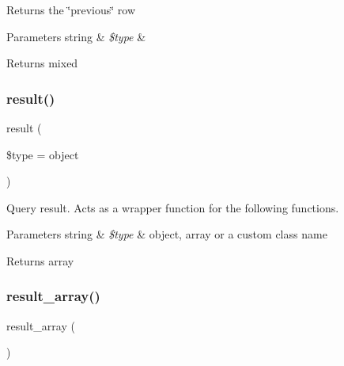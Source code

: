 Returns the \char`\"{}previous\char`\"{} row


\begin{DoxyParams}[1]{Parameters}
string & {\em \$type} & \\
\hline
\end{DoxyParams}
\begin{DoxyReturn}{Returns}
mixed 
\end{DoxyReturn}
\mbox{\label{class_c_i___d_b__result_a86bc3a5f1694241cf86a6fd754553884}} 
\subsubsection{\texorpdfstring{result()}{result()}}
{\footnotesize\ttfamily result (\begin{DoxyParamCaption}\item[{}]{\$type = {\ttfamily \textquotesingle{}object\textquotesingle{}} }\end{DoxyParamCaption})}

Query result. Acts as a wrapper function for the following functions.


\begin{DoxyParams}[1]{Parameters}
string & {\em \$type} & \textquotesingle{}object\textquotesingle{}, \textquotesingle{}array\textquotesingle{} or a custom class name \\
\hline
\end{DoxyParams}
\begin{DoxyReturn}{Returns}
array 
\end{DoxyReturn}
\mbox{\label{class_c_i___d_b__result_a444f7dd61bfbe3931a7188adad61feae}} 
\subsubsection{\texorpdfstring{result\+\_\+array()}{result\_array()}}
{\footnotesize\ttfamily result\+\_\+array (\begin{DoxyParamCaption}{ }\end{DoxyParamCaption})}

